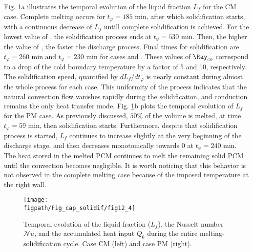 \noindent Fig. \ref{fig:Lf_full_1D_profil}a illustrates the temporal evolution of the liquid fraction $L_f$ for the CM case. 
Complete melting occurs for $t_{\varphi} =185$ min, after which solidification starts, with a continuous decrease of $L_f$ untill complete solidification is achieved. 
For the lowest value of , the solidification process ends at $t_{\varphi} = 530$ min. 
Then, the higher the value of , the faster the discharge process.
Final times for solidification are $t_{\varphi} = 260$ min and $t_{\varphi} = 230$ min for cases  and . 
These values of $\Ray_{co}$ correspond to a drop of the cold boundary temperature by a factor of 5 and 10, respectively. 
The solidification speed, quantified by $d L_f/ d t_{\varphi}$ is  nearly constant during almost the whole process for each case.  
This uniformity of the process indicates that the natural convection flow vanishes rapidly during the solidification, and conduction remains the only heat transfer mode. 
Fig. \ref{fig:Lf_full_1D_profil}b plots the temporal evolution of $L_f$ for the PM case. 
As previously discussed, $50\%$ of the volume is melted, at time $t_{\varphi} = 59$ min, then solidification starts. 
Furthermore, despite that solidification process is started, $L_f$ continues to increase slightly at the very beginning of the discharge stage, and then decreases monotonically towards $0$ at $t_{\varphi} = 240$ min.
The heat stored in the melted PCM continues to melt the remaining solid PCM until the convection becomes negligible.
It is worth noticing that this behavior is not observed in the complete melting case because of the imposed temperature at the right wall.  


\begin{figure}
\begin{center}
\begin{minipage}[t]{0.9\textwidth}
	\texttt{[image: \\figpath/Fig\_cap\_solidif/fig12\_4]}
\end{minipage}
\end{center}
\caption{Temporal evolution of the  liquid fraction ($L_f$), the Nusselt number $\mathcal{N}\!u$, and the accumulated heat input $Q_0$ during the entire melting-solidification cycle. Case CM  (left) and  case PM  (right).}\label{fig:Lf_full_1D_profil}
\end{figure}

